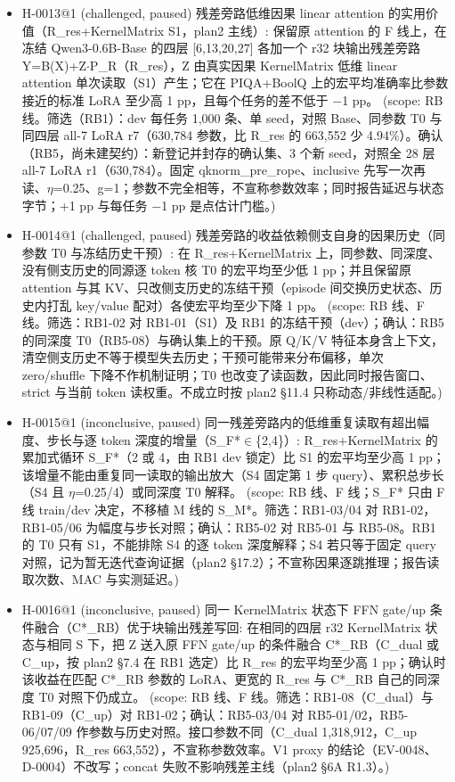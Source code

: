 \documentclass[11pt]{article}
\begin{document}
\begin{itemize}
\item H-0013@1 (challenged, paused) 残差旁路低维因果 linear attention 的实用价值（R\_res+KernelMatrix S1，plan2 主线）: 保留原 attention 的 F 线上，在冻结 Qwen3-0.6B-Base 的四层 [6,13,20,27] 各加一个 r32 块输出残差旁路 Y=B(X)+Z\ensuremath{\cdot}P\_R（R\_res），Z 由真实因果 KernelMatrix 低维 linear attention 单次读取（S1）产生；它在 PIQA+BoolQ 上的宏平均准确率比参数接近的标准 LoRA 至少高 1 pp，且每个任务的差不低于 \ensuremath{-}1 pp。 (scope: RB 线。筛选（RB1）：dev 每任务 1,000 条、单 seed，对照 Base、同参数 T0 与同四层 all-7 LoRA r7（630,784 参数，比 R\_res 的 663,552 少 4.94\%）。确认（RB5，尚未建契约）：新登记并封存的确认集、3 个新 seed，对照全 28 层 all-7 LoRA r1（630,784）。固定 qknorm\_pre\_rope、inclusive 先写一次再读、\ensuremath{\eta}=0.25、g=1；参数不完全相等，不宣称参数效率；同时报告延迟与状态字节；+1 pp 与每任务 \ensuremath{-}1 pp 是点估计门槛。)
\item H-0014@1 (challenged, paused) 残差旁路的收益依赖侧支自身的因果历史（同参数 T0 与冻结历史干预）: 在 R\_res+KernelMatrix 上，同参数、同深度、没有侧支历史的同源逐 token 核 T0 的宏平均至少低 1 pp；并且保留原 attention 与其 KV、只改侧支历史的冻结干预（episode 间交换历史状态、历史内打乱 key/value 配对）各使宏平均至少下降 1 pp。 (scope: RB 线、F 线。筛选：RB1-02 对 RB1-01（S1）及 RB1 的冻结干预（dev）；确认：RB5 的同深度 T0（RB5-08）与确认集上的干预。原 Q/K/V 特征本身含上下文，清空侧支历史不等于模型失去历史；干预可能带来分布偏移，单次 zero/shuffle 下降不作机制证明；T0 也改变了读函数，因此同时报告窗口、strict 与当前 token 读权重。不成立时按 plan2 §11.4 只称动态/非线性适配。)
\item H-0015@1 (inconclusive, paused) 同一残差旁路内的低维重复读取有超出幅度、步长与逐 token 深度的增量（S\_F*\ensuremath{\in}\{2,4\}）: R\_res+KernelMatrix 的累加式循环 S\_F*（2 或 4，由 RB1 dev 锁定）比 S1 的宏平均至少高 1 pp；该增量不能由重复同一读取的输出放大（S4 固定第 1 步 query）、累积总步长（S4 且 \ensuremath{\eta}=0.25/4）或同深度 T0 解释。 (scope: RB 线、F 线；S\_F* 只由 F 线 train/dev 决定，不移植 M 线的 S\_M*。筛选：RB1-03/04 对 RB1-02，RB1-05/06 为幅度与步长对照；确认：RB5-02 对 RB5-01 与 RB5-08。RB1 的 T0 只有 S1，不能排除 S4 的逐 token 深度解释；S4 若只等于固定 query 对照，记为暂无迭代查询证据（plan2 §17.2）；不宣称因果逐跳推理；报告读取次数、MAC 与实测延迟。)
\item H-0016@1 (inconclusive, paused) 同一 KernelMatrix 状态下 FFN gate/up 条件融合（C*\_RB）优于块输出残差写回: 在相同的四层 r32 KernelMatrix 状态与相同 S 下，把 Z 送入原 FFN gate/up 的条件融合 C*\_RB（C\_dual 或 C\_up，按 plan2 §7.4 在 RB1 选定）比 R\_res 的宏平均至少高 1 pp；确认时该收益在匹配 C*\_RB 参数的 LoRA、更宽的 R\_res 与 C*\_RB 自己的同深度 T0 对照下仍成立。 (scope: RB 线、F 线。筛选：RB1-08（C\_dual）与 RB1-09（C\_up）对 RB1-02；确认：RB5-03/04 对 RB5-01/02，RB5-06/07/09 作参数与历史对照。接口参数不同（C\_dual 1,318,912，C\_up 925,696，R\_res 663,552），不宣称参数效率。V1 proxy 的结论（EV-0048、D-0004）不改写；concat 失败不影响残差主线（plan2 §6A R1.3）。)

\end{itemize}
\end{document}
